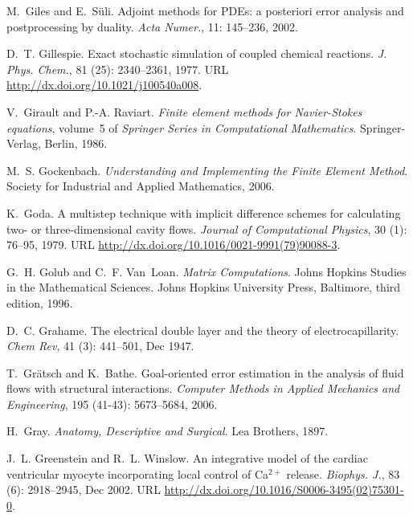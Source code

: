 \begin{thebibliography}{467}
M.~Giles and E.~S{\" u}li.
\newblock Adjoint methods for {PDE}s: a posteriori error analysis and
  postprocessing by duality.
\newblock \emph{Acta Numer.}, 11: 145--236, 2002.

D.~T. Gillespie.
\newblock Exact stochastic simulation of coupled chemical reactions.
\newblock \emph{J. Phys. Chem.}, 81 (25): 2340--2361, 1977.
\newblock URL \url{http://dx.doi.org/10.1021/j100540a008}.

V.~Girault and P.-A. Raviart.
\newblock \emph{Finite element methods for {N}avier-{S}tokes equations},
  volume~5 of \emph{Springer Series in Computational Mathematics}.
\newblock Springer-Verlag, Berlin, 1986.

M.~S. Gockenbach.
\newblock \emph{Understanding and Implementing the Finite Element Method}.
\newblock Society for Industrial and Applied Mathematics, 2006.

K.~Goda.
\newblock A multistep technique with implicit difference schemes for
  calculating two- or three-dimensional cavity flows.
\newblock \emph{Journal of Computational Physics}, 30 (1):
  76--95, 1979.
\newblock URL \url{http://dx.doi.org/10.1016/0021-9991(79)90088-3}.

G.~H. Golub and C.~F. Van~Loan.
\newblock \emph{Matrix Computations}.
\newblock Johns Hopkins Studies in the Mathematical Sciences. Johns Hopkins
  University Press, Baltimore, third edition, 1996.

D.~C. Grahame.
\newblock The electrical double layer and the theory of electrocapillarity.
\newblock \emph{Chem Rev}, 41 (3): 441--501, Dec 1947.

T.~Gr\"{a}tsch and K.~Bathe.
\newblock Goal-oriented error estimation in the analysis of fluid flows with
  structural interactions.
\newblock \emph{Computer Methods in Applied Mechanics and Engineering},
  195 (41-43): 5673--5684, 2006.

H.~Gray.
\newblock \emph{Anatomy, Descriptive and Surgical}.
\newblock Lea Brothers, 1897.

J.~L. Greenstein and R.~L. Winslow.
\newblock An integrative model of the cardiac ventricular myocyte incorporating
  local control of {C}a$^{2+}$ release.
\newblock \emph{Biophys. J.}, 83 (6): 2918--2945, Dec 2002.
\newblock URL \url{http://dx.doi.org/10.1016/S0006-3495(02)75301-0}.


\end{thebibliography}
